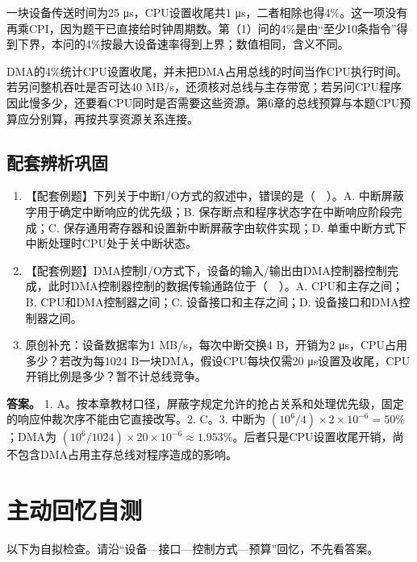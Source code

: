 一块设备传送时间为25 μs，CPU设置收尾共1 μs，二者相除也得4\%。这一项没有再乘CPI，因为题干已直接给时钟周期数。第（1）问的4\%是由``至少10条指令''得到下界，本问的4\%按最大设备速率得到上界；数值相同，含义不同。

DMA的4\%统计CPU设置收尾，并未把DMA占用总线的时间当作CPU执行时间。若另问整机吞吐是否可达40 MB/s，还须核对总线与主存带宽；若另问CPU程序因此慢多少，还要看CPU同时是否需要这些资源。第6章的总线预算与本题CPU预算应分别算，再按共享资源关系连接。

\subsection{配套辨析巩固}\label{CO07-old-self}

\begin{enumerate}
\def\labelenumi{\arabic{enumi}.}
\tightlist
\item
  【配套例题】下列关于中断I/O方式的叙述中，错误的是（　）。A. 中断屏蔽字用于确定中断响应的优先级；B. 保存断点和程序状态字在中断响应阶段完成；C. 保存通用寄存器和设置新中断屏蔽字由软件实现；D. 单重中断方式下中断处理时CPU处于关中断状态。
\item
  【配套例题】DMA控制I/O方式下，设备的输入/输出由DMA控制器控制完成，此时DMA控制器控制的数据传输通路位于（　）。A. CPU和主存之间；B. CPU和DMA控制器之间；C. 设备接口和主存之间；D. 设备接口和DMA控制器之间。
\item
  原创补充：设备数据率为1 MB/s，每次中断交换4 B，开销为2 μs，CPU占用多少？若改为每1024 B一块DMA，假设CPU每块仅需20 μs设置及收尾，CPU开销比例是多少？暂不计总线竞争。
\end{enumerate}

\textbf{答案。} 1. A。按本章教材口径，屏蔽字规定允许的抢占关系和处理优先级，固定的响应仲裁次序不能由它直接改写。2. C。3. 中断为 \((10^6/4)\times2\times10^{-6}=50\%\)；DMA为 \((10^6/1024)\times20\times10^{-6}\approx1.953\%\)。后者只是CPU设置收尾开销，尚不包含DMA占用主存总线对程序造成的影响。

\section{主动回忆自测}\label{CO07-recall}

以下为自拟检查。请沿``设备---接口---控制方式---预算''回忆，不先看答案。

